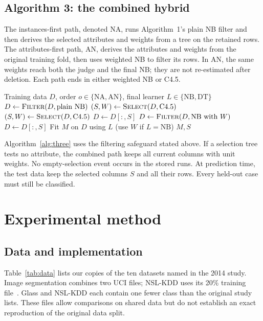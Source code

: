 \documentclass[conference]{IEEEtran}
\begin{document}
\subsection{Algorithm 3: the combined hybrid}
The instances-first path, denoted NA, runs Algorithm~1's plain NB filter
and then derives the selected attributes and weights from a tree on the
retained rows. The attributes-first path, AN, derives the attributes and
weights from the original training fold, then uses weighted NB to filter
its rows. In AN, the same weights reach both the judge and the final NB;
they are not re-estimated after deletion. Each path ends in either weighted
NB or C4.5.

\setcounter{algorithm}{2}
\begin{algorithm}[t]
\caption{Combined cleaning and classification}
\label{alg:three}
\begin{algorithmic}[1]
\Require Training data $D$, order $o\in\{\mathrm{NA},\mathrm{AN}\}$,
 final learner $L\in\{\mathrm{NB},\mathrm{DT}\}$
 \State $D\gets\Call{Filter}{D,\text{plain NB}}$
 \State $(S,W)\gets\Call{Select}{D,\text{C4.5}}$
\Else
 \State $(S,W)\gets\Call{Select}{D,\text{C4.5}}$
 \State $D\gets D[:,S]$
 \State $D\gets\Call{Filter}{D,\text{NB with }W}$
\EndIf
{}
 \State $D\gets D[:,S]$
\EndIf
\State Fit $M$ on $D$ using $L$ (use $W$ if $L=\mathrm{NB}$)
\State \Return $M,S$
\end{algorithmic}
\end{algorithm}

Algorithm~\ref{alg:three} uses the filtering safeguard stated above. If a
selection tree tests no attribute, the combined path keeps all current
columns with unit weights. No empty-selection event occurs in the stored
runs. At prediction time, the test data keep the selected columns $S$ and
all their rows. Every held-out case must still be classified.

\section{Experimental method}
\subsection{Data and implementation}
Table~\ref{tab:data} lists our copies of the ten datasets named in the
2014 study. Image segmentation combines two UCI files; NSL-KDD uses its
20\% training file~\cite{tavallaee2009detailed}. Glass and NSL-KDD each
contain one fewer class than the original study lists. These files allow
comparisons on shared data but do not establish an exact reproduction of
the original data split.
\end{document}
